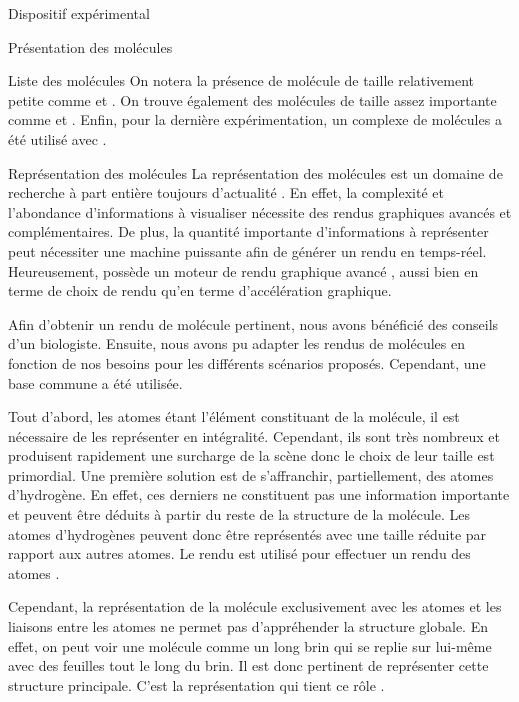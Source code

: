 \documentclass[myfrancais,ngerman,english,french]{mythesis}
\begin{document}
\begin{mychapter}{Dispositif expérimental}
\begin{mysection}{Présentation des molécules}
\begin{mysubsection}{Liste des molécules}
				On notera la présence de molécule de taille relativement petite comme \myTRPZIPPER et \myTRPCAGE.
				On trouve également des molécules de taille assez importante comme \myPrion et \myUbiquitin.
				Enfin, pour la dernière expérimentation, un complexe de molécules a été utilisé avec \myNusENusG.
			\end{mysubsection}
			\begin{mysubsection}{Représentation des molécules}
				La représentation des molécules est un domaine de recherche à part entière toujours d'actualité .
				En effet, la complexité et l'abondance d'informations à visualiser nécessite des rendus graphiques avancés et complémentaires.
				De plus, la quantité importante d'informations à représenter peut nécessiter une machine puissante afin de générer un rendu en temps-réel.
				Heureusement,  possède un moteur de rendu graphique avancé , aussi bien en terme de choix de rendu qu'en terme d'accélération graphique.

				Afin d'obtenir un rendu de molécule pertinent, nous avons bénéficié des conseils d'un biologiste.
				Ensuite, nous avons pu adapter les rendus de molécules en fonction de nos besoins pour les différents scénarios proposés.
				Cependant, une base commune a été utilisée.

				Tout d'abord, les atomes étant l'élément constituant de la molécule, il est nécessaire de les représenter en intégralité.
				Cependant, ils sont très nombreux et produisent rapidement une surcharge de la scène donc le choix de leur taille est primordial.
				Une première solution est de s'affranchir, partiellement, des atomes d'hydrogène.
				En effet, ces derniers ne constituent pas une information importante et peuvent être déduits à partir du reste de la structure de la molécule.
				Les atomes d'hydrogènes peuvent donc être représentés avec une taille réduite par rapport aux autres atomes.
				Le rendu \myCPK est utilisé pour effectuer un rendu des atomes .

				\begin{myfigure}
				\end{myfigure}

				Cependant, la représentation de la molécule exclusivement avec les atomes et les liaisons entre les atomes ne permet pas d'appréhender la structure globale.
				En effet, on peut voir une molécule comme un long brin qui se replie sur lui-même avec des feuilles tout le long du brin.
				Il est donc pertinent de représenter cette structure principale.
				C'est la représentation \myNewRibbon qui tient ce rôle .


\end{mysubsection}
\end{mysection}
\end{mychapter}
\end{document}
